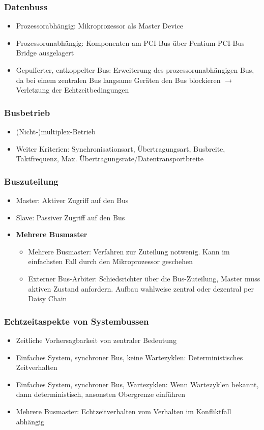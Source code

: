 \subsubsection{Datenbuss}
\begin{itemize}
	\item Prozessorabhängig: Mikroprozessor als Master Device
	\item Prozessorunabhängig: Komponenten am PCI-Bus über Pentium-PCI-Bus Bridge ausgelagert
	\item Gepufferter, entkoppelter Bus: Erweiterung des prozessorunabhängigen Bus, da bei einem zentralen Bus langsame Geräten den Bus blockieren $\rightarrow$ Verletzung der Echtzeitbedingungen
\end{itemize}

\subsubsection{Busbetrieb}
\begin{itemize}
	\item (Nicht-)multiplex-Betrieb
	\item Weiter Kriterien: Synchronisationsart, Übertragungsart, Busbreite, Taktfrequenz, Max. Übertragungsrate/Datentransportbreite
\end{itemize}

\subsubsection{Buszuteilung}
\begin{itemize}
	\item Master: Aktiver Zugriff auf den Bus
	\item Slave: Passiver Zugriff auf den Bus
	\item \textbf{Mehrere Busmaster}
	\begin{itemize}
		\item Mehrere Busmaster: Verfahren zur Zuteilung notwenig. Kann im einfachsten Fall durch den Mikroprozessor geschehen
		\item Externer Bus-Arbiter: Schiedsrichter über die Bus-Zuteilung, Master muss aktiven Zustand anfordern. Aufbau wahlweise zentral oder dezentral per Daisy Chain
	\end{itemize}
\end{itemize}

\subsubsection{Echtzeitaspekte von Systembussen}
\begin{itemize}
	\item Zeitliche Vorhersagbarkeit von zentraler Bedeutung
	\item Einfaches System, synchroner Bus, keine Wartezyklen: Deterministisches Zeitverhalten
	\item Einfaches System, synchroner Bus, Wartezyklen: Wenn Wartezyklen bekannt, dann deterministisch, ansonsten Obergrenze einführen
	\item Mehrere Busmaster: Echtzeitverhalten vom Verhalten im Konfliktfall abhängig
\end{itemize}

